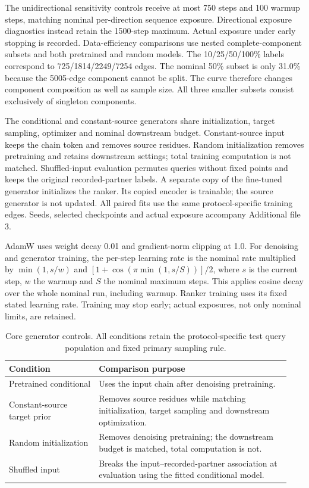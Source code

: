 \documentclass[a4paper,11pt]{article}
\begin{document}
The unidirectional sensitivity controls receive at most 750 steps and 100
warmup steps, matching nominal per-direction sequence exposure. Directional
exposure diagnostics instead retain the 1500-step maximum. Actual exposure under early
stopping is recorded. Data-efficiency comparisons use nested complete-component
subsets and both pretrained and random models. The 10/25/50/100\% labels
correspond to 725/1814/2249/7254 edges. The nominal 50\% subset is only 31.0\%
because the 5005-edge component cannot be split. The curve therefore changes
component composition as well as sample size.
All three smaller subsets consist exclusively of singleton components.

The conditional and constant-source generators share initialization, target
sampling, optimizer and nominal downstream budget. Constant-source input keeps
the chain token and removes source residues. Random initialization removes
pretraining and retains downstream settings; total training computation is not
matched. Shuffled-input evaluation permutes queries without fixed points and
keeps the original recorded-partner labels. A separate copy of the fine-tuned
generator initializes the ranker. Its copied encoder is trainable; the source
generator is not updated. All paired fits use the same protocol-specific
training edges. Seeds, selected checkpoints and actual exposure accompany
Additional file 3.

AdamW uses weight decay 0.01 and gradient-norm clipping at 1.0. For denoising and
generator training, the per-step learning rate is the nominal rate multiplied
by $\min(1,s/w)$ and $[1+\cos(\pi\min(1,s/S))]/2$, where $s$ is the current
step, $w$ the warmup and $S$ the nominal maximum steps. This applies cosine
decay over the whole nominal run, including warmup. Ranker training uses its
fixed stated learning rate. Training may stop early; actual exposures, not only
nominal limits, are retained.


\begin{table}[htbp]
\centering
\caption{Core generator controls. All conditions retain the protocol-specific test query population and fixed primary sampling rule.}
\label{tab:controls}
\begin{tabular}{p{0.30\linewidth}p{0.64\linewidth}}
\toprule
Condition & Comparison purpose\\
\midrule
Pretrained conditional & Uses the input chain after denoising pretraining.\\
Constant-source target prior & Removes source residues while matching initialization, target sampling and downstream optimization.\\
Random initialization & Removes denoising pretraining; the downstream budget is matched, total computation is not.\\
Shuffled input & Breaks the input--recorded-partner association at evaluation using the fitted conditional model.\\
\bottomrule
\end{tabular}
\end{table}
\end{document}
